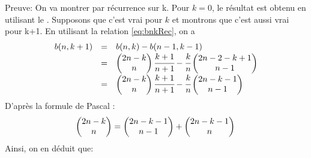 Preuve:
On va montrer par récurrence sur k. Pour $k=0$, le résultat est obtenu en utilisant le .
Supposons que c'est vrai pour $k$ et montrons que c'est aussi vrai pour k+1. En utilisant la relation \eqref{eq:bnkRec}, on a
\[
	\begin{array} {l l l}
		b(n,k+1) & = & b(n,k)-b(n-1,k-1)                                                                                           \\
		         & = & \begin{pmatrix} 2n-k\\n\end{pmatrix}\cfrac{k+1}{n+1}-\cfrac{k}{n}\begin{pmatrix} 2n-2-k+1\\n-1\end{pmatrix} \\
		         & = & \begin{pmatrix} 2n-k\\n\end{pmatrix}\cfrac{k+1}{n+1}-\cfrac{k}{n}\begin{pmatrix} 2n-k-1\\n-1\end{pmatrix}   \\
	\end{array}
\]
D'après la formule de Pascal :\[\begin{pmatrix} 2n-k\\n\end{pmatrix}=\begin{pmatrix} 2n-k-1\\n-1\end{pmatrix}+\begin{pmatrix} 2n-k-1\\n\end{pmatrix}\\\]
Ainsi, on en déduit que:
